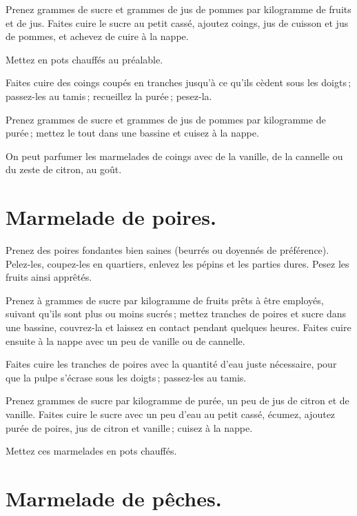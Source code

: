 Prenez {\mmm} grammes de sucre et {\mmm} grammes de jus de pommes
par kilogramme de fruits et de jus. Faites cuire le sucre au petit cassé,
ajoutez coings, jus de cuisson et jus de pommes, et achevez de cuire à la
nappe.

Mettez en pots chauffés au préalable.

\sk

Faites cuire des coings coupés en tranches jusqu'à ce qu'ils cèdent sous les
doigts ; passez-les au tamis ; recueillez la purée ; pesez-la.

Prenez {\mmm} grammes de sucre et {\mmm} grammes de jus de pommes
par kilogramme de purée ; mettez le tout dans une bassine et cuisez à la nappe.

\medskip

On peut parfumer les marmelades de coings avec de la vanille, de la cannelle
ou du zeste de citron, au goût.

\section*{\centering Marmelade de poires.}
{}

Prenez des poires fondantes bien saines (beurrés ou doyennés de préférence).
Pelez-les, coupez-les en quartiers, enlevez les pépins et les parties dures.
Pesez les fruits ainsi apprêtés.

Prenez {\mmm} à {\mmm} grammes de sucre par kilogramme de fruits
prêts à être employés, suivant qu'ils sont plus ou moins sucrés ; mettez
tranches de poires et sucre dans une bassine, couvrez-la et laissez en contact
pendant quelques heures. Faites cuire ensuite à la nappe avec un peu de vanille
ou de cannelle.

\sk

Faites cuire les tranches de poires avec la quantité d'eau juste nécessaire,
pour que la pulpe s'écrase sous les doigts ; passez-les au tamis.

Prenez {\mmm} grammes de sucre par kilogramme de purée, un peu de jus de
citron et de vanille. Faites cuire le sucre avec un peu d'eau au petit cassé,
écumez, ajoutez purée de poires, jus de citron et vanille ; cuisez à la nappe.

Mettez ces marmelades en pots chauffés.

\section*{\centering Marmelade de pêches.}
{}

